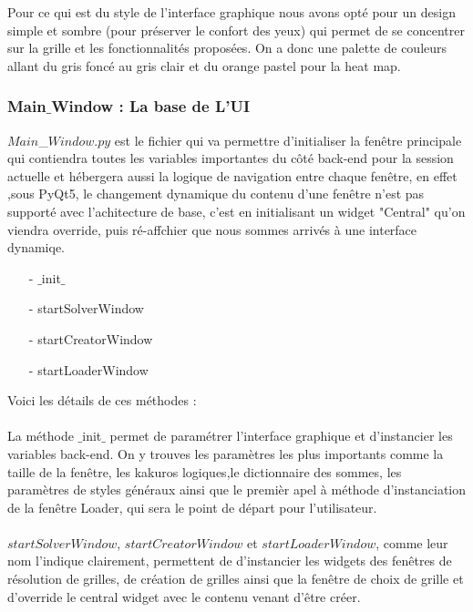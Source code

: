 \documentclass[french,12pt]{article}
\begin{document}
Pour ce qui est du style de l'interface graphique nous avons opté pour un design simple et sombre (pour préserver le confort des yeux) qui permet de se concentrer sur la grille et les fonctionnalités proposées. On a donc une palette de couleurs allant du gris foncé au gris clair et du orange pastel pour la heat map.
\newpage
\subsubsection{Main$\_$Window : La base de L'UI}

$Main$\_$Window.py$ est le fichier qui va permettre d'initialiser la fenêtre principale qui contiendra toutes les variables importantes du côté back-end pour la session actuelle et hébergera aussi la logique de navigation entre chaque fenêtre, en effet ,sous PyQt5, le changement dynamique du contenu d'une fenêtre n'est pas supporté avec l'achitecture de base, c'est en initialisant un widget "Central" qu'on viendra override, puis ré-affchier que nous sommes arrivés à une interface dynamiqe. \\
\begin{enumerate}
	\item[-] $\_$init$\_$ 
	\item[-] startSolverWindow  
	\item[-] startCreatorWindow 
	\item[-] startLoaderWindow \\
\end{enumerate}
Voici les détails de ces méthodes : \\ \\
La méthode $\_$init$\_$ permet de paramétrer l'interface graphique et d'instancier les variables back-end. On y trouves les paramètres les plus importants comme la taille de la fenêtre, les kakuros logiques,le dictionnaire des sommes, les paramètres de styles généraux ainsi que le premièr apel à méthode d'instanciation de la fenêtre Loader, qui sera le point de départ pour l'utilisateur. \\ \\

$startSolverWindow$, $startCreatorWindow$ et $startLoaderWindow$, comme leur nom l'indique clairement, permettent de d'instancier les widgets des fenêtres de résolution de grilles, de création de grilles ainsi que la fenêtre de choix de grille et d'override le central widget avec le contenu venant d'être créer. \\ \\
\end{document}
